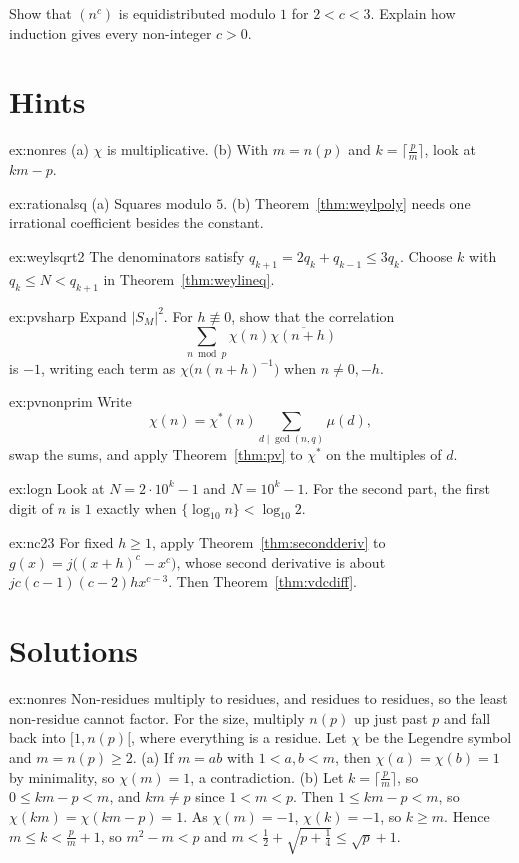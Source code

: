 \begin{exercise}[$\star\star\star$]\label{ex:nc23}
Show that $(n^c)$ is equidistributed modulo $1$ for $2<c<3$. Explain how induction gives every non-integer $c>0$.
\end{exercise}

\section{Hints}

\begin{hint}{ex:nonres}
(a) $\chi$ is multiplicative. (b) With $m=n(p)$ and $k=\lceil\frac pm\rceil$, look at $km-p$.
\end{hint}
\begin{hint}{ex:rationalsq}
(a) Squares modulo $5$. (b) Theorem~\ref{thm:weylpoly} needs one irrational coefficient besides the constant.
\end{hint}
\begin{hint}{ex:weylsqrt2}
The denominators satisfy $q_{k+1}=2q_k+q_{k-1}\le3q_k$. Choose $k$ with $q_k\le N<q_{k+1}$ in Theorem~\ref{thm:weylineq}.
\end{hint}
\begin{hint}{ex:pvsharp}
Expand $|S_M|^2$. For $h\not\equiv0$, show that the correlation
\[
\sum_{n\bmod p}\chi(n)\overline{\chi(n+h)}
\]
is $-1$, writing each term as $\chi\bigl(n(n+h)^{-1}\bigr)$ when $n\ne0,-h$.
\end{hint}
\begin{hint}{ex:pvnonprim}
Write
\[
\chi(n)=\chi^*(n)\sum_{d\mid\gcd(n,q)}\mu(d),
\]
swap the sums, and apply Theorem~\ref{thm:pv} to $\chi^*$ on the multiples of $d$.
\end{hint}
\begin{hint}{ex:logn}
Look at $N=2\cdot10^k-1$ and $N=10^k-1$. For the second part, the first digit of $n$ is $1$ exactly when $\{\log_{10}n\}<\log_{10}2$.
\end{hint}
\begin{hint}{ex:nc23}
For fixed $h\ge1$, apply Theorem~\ref{thm:secondderiv} to $g(x)=j\bigl((x+h)^c-x^c\bigr)$, whose second derivative is about $jc(c-1)(c-2)hx^{c-3}$. Then Theorem~\ref{thm:vdcdiff}.
\end{hint}

\section{Solutions}

\begin{solution}{ex:nonres}
\idea Non-residues multiply to residues, and residues to residues, so the least non-residue cannot factor. For the size, multiply $n(p)$ up just past $p$ and fall back into $[1,n(p)[$, where everything is a residue.
\writeup Let $\chi$ be the Legendre symbol and $m=n(p)\ge2$. (a) If $m=ab$ with $1<a,b<m$, then $\chi(a)=\chi(b)=1$ by minimality, so $\chi(m)=1$, a contradiction. (b) Let $k=\lceil\frac pm\rceil$, so $0\le km-p<m$, and
$km\ne p$ since $1<m<p$. Then $1\le km-p<m$, so $\chi(km)=\chi(km-p)=1$. As $\chi(m)=-1$, $\chi(k)=-1$, so $k\ge m$. Hence $m\le k<\frac pm+1$, so $m^2-m<p$ and $m<\frac12+\sqrt{p+\frac14}\le\sqrt p+1$.
\end{solution}

